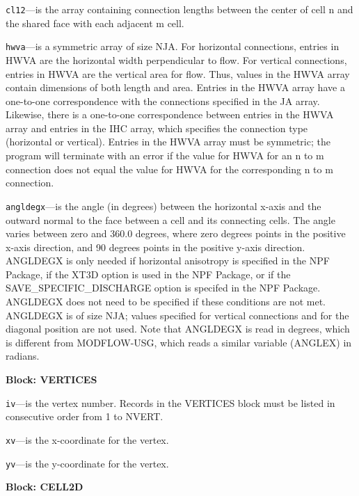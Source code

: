 \begin{description}
\item \texttt{cl12}---is the array containing connection lengths between the center of cell n and the shared face with each adjacent m cell.

\item \texttt{hwva}---is a symmetric array of size NJA.  For horizontal connections, entries in HWVA are the horizontal width perpendicular to flow.  For vertical connections, entries in HWVA are the vertical area for flow.  Thus, values in the HWVA array contain dimensions of both length and area.  Entries in the HWVA array have a one-to-one correspondence with the connections specified in the JA array.  Likewise, there is a one-to-one correspondence between entries in the HWVA array and entries in the IHC array, which specifies the connection type (horizontal or vertical).  Entries in the HWVA array must be symmetric; the program will terminate with an error if the value for HWVA for an n to m connection does not equal the value for HWVA for the corresponding n to m connection.

\item \texttt{angldegx}---is the angle (in degrees) between the horizontal x-axis and the outward normal to the face between a cell and its connecting cells. The angle varies between zero and 360.0 degrees, where zero degrees points in the positive x-axis direction, and 90 degrees points in the positive y-axis direction.  ANGLDEGX is only needed if horizontal anisotropy is specified in the NPF Package, if the XT3D option is used in the NPF Package, or if the SAVE_SPECIFIC_DISCHARGE option is specifed in the NPF Package.  ANGLDEGX does not need to be specified if these conditions are not met.  ANGLDEGX is of size NJA; values specified for vertical connections and for the diagonal position are not used.  Note that ANGLDEGX is read in degrees, which is different from MODFLOW-USG, which reads a similar variable (ANGLEX) in radians.

\end{description}
\item \textbf{Block: VERTICES}

\begin{description}
\item \texttt{iv}---is the vertex number.  Records in the VERTICES block must be listed in consecutive order from 1 to NVERT.

\item \texttt{xv}---is the x-coordinate for the vertex.

\item \texttt{yv}---is the y-coordinate for the vertex.

\end{description}
\item \textbf{Block: CELL2D}

